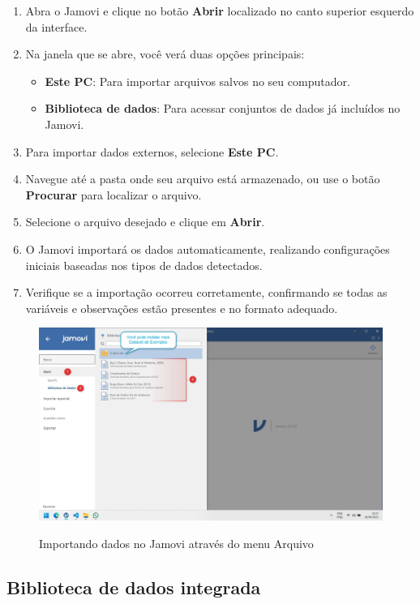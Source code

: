 \begin{enumerate}
    \item Abra o Jamovi e clique no botão \textbf{Abrir} localizado no canto superior esquerdo da interface.
    \item Na janela que se abre, você verá duas opções principais:
    \begin{itemize}
        \item \textbf{Este PC}: Para importar arquivos salvos no seu computador.
        \item \textbf{Biblioteca de dados}: Para acessar conjuntos de dados já incluídos no Jamovi.
    \end{itemize}
    \item Para importar dados externos, selecione \textbf{Este PC}.
    \item Navegue até a pasta onde seu arquivo está armazenado, ou use o botão \textbf{Procurar} para localizar o arquivo.
    \item Selecione o arquivo desejado e clique em \textbf{Abrir}.
    \item O Jamovi importará os dados automaticamente, realizando configurações iniciais baseadas nos tipos de dados detectados.
    \item Verifique se a importação ocorreu corretamente, confirmando se todas as variáveis e observações estão presentes e no formato adequado.
\end{enumerate}

\begin{figure}[H]
    \centering
    \caption{Importando dados no Jamovi através do menu Arquivo}
    \includegraphics[width=\textwidth]{imagens/cap_2/importar_dados_jamovi_1.jpg}
    \label{fig:importar_dados_jamovi_1}
\end{figure}

\subsection{Biblioteca de dados integrada}

